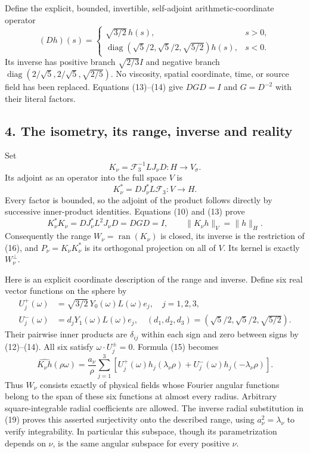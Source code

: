 Define the explicit, bounded, invertible, self-adjoint arithmetic-coordinate operator \[
(Dh)(s)=
\begin{cases}
\sqrt{3/2}\,h(s),&s>0,\\
\operatorname{diag}(\sqrt5/2,\sqrt5/2,\sqrt{5/2})h(s),&s<0.
\end{cases}
\tag{14}
\] Its inverse has positive branch \(\sqrt{2/3}I\) and negative branch \(\operatorname{diag}(2/\sqrt5,2/\sqrt5,\sqrt{2/5})\). No viscosity, spatial coordinate, time, or source field has been replaced. Equations (13)--(14) give \(DGD=I\) and \(G=D^{-2}\) with their literal factors.

\subsection{4. The isometry, its range, inverse and reality}\label{the-isometry-its-range-inverse-and-reality}

Set \[
K_\nu=\mathcal F_3^{-1}LJ_\nu D:H\longrightarrow V_\sigma.
\tag{15}
\] Its adjoint as an operator into the full space \(V\) is \[
K_\nu^*=D J_\nu^*L\mathcal F_3:V\longrightarrow H.
\tag{16}
\] Every factor is bounded, so the adjoint of the product follows directly by successive inner-product identities. Equations (10) and (13) prove \[
K_\nu^*K_\nu=D J_\nu^*L^2J_\nu D=DGD=I,
\qquad\|K_\nu h\|_V=\|h\|_H.
\tag{17}
\] Consequently the range \(W_\nu=\operatorname{ran}(K_\nu)\) is closed, its inverse is the restriction of (16), and \(P_\nu=K_\nu K_\nu^*\) is its orthogonal projection on all of \(V\). Its kernel is exactly \(W_\nu^\perp\).

Here is an explicit coordinate description of the range and inverse. Define six real vector functions on the sphere by \[
\begin{aligned}
U_j^+(\omega)&=\sqrt{3/2}\,Y_0(\omega)L(\omega)e_j,\quad j=1,2,3,\\
U_j^-(\omega)&=d_jY_1(\omega)L(\omega)e_j,\quad
(d_1,d_2,d_3)=(\sqrt5/2,\sqrt5/2,\sqrt{5/2}).
\end{aligned}
\tag{18}
\] Their pairwise inner products are \(\delta_{ij}\) within each sign and zero between signs by (12)--(14). All six satisfy \(\omega\cdot U_j^\pm=0\). Formula (15) becomes \[
\widehat{K_\nu h}(\rho\omega)=\frac{a_\nu}{\rho}
\sum_{j=1}^3\left[U_j^+(\omega)h_j(\lambda_\nu\rho)
+U_j^-(\omega)h_j(-\lambda_\nu\rho)\right].
\tag{19}
\] Thus \(W_\nu\) consists exactly of physical fields whose Fourier angular functions belong to the span of these six functions at almost every radius. Arbitrary square-integrable radial coefficients are allowed. The inverse radial substitution in (19) proves this asserted surjectivity onto the described range, using \(a_\nu^2=\lambda_\nu\) to verify integrability. In particular this subspace, though its parametrization depends on \(\nu\), is the same angular subspace for every positive \(\nu\).

